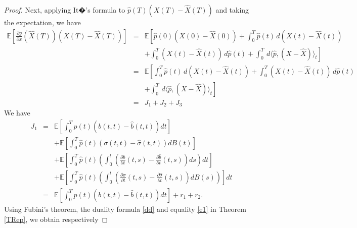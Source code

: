 \documentclass[12pt]{article}
\theoremstyle{remark}
\numberwithin{equation}{section}
\def\E{\mathbb E}
\def\E{\mathbb E}
\begin{document}
\begin{proof}
Next, applying It�'s formula to $\hat{p}(T)(X(T)-\hat{X}(T))$ and taking the expectation, we have
\begin{eqnarray}\label{Eq0005}
	\E\left[ \frac{\partial g}{\partial x}(\hat{X}(T))\left(X(T)-\hat{X}(T)\right)\right]  &=&\E\left[ \hat{p}(0)\left( X(0)-\hat{X}(0)\right)+\int_0^T \hat{p}(t)\,d\left( X(t)-\hat{X}(t)\right)\right.\nonumber \\
	&&\left. +\int_0^T\left( X(t)-\hat{X}(t)\right)\,d\hat{p}(t)
	+\int_0^T\,d\langle \hat{p},\left( X-\hat{X}\right)\rangle_t\right]\nonumber\\
&=&	\E\left[\int_0^T \hat{p}(t)\,d\left( X(t)-\hat{X}(t)\right)+\int_0^T\left( X(t)-\hat{X}(t)\right)\,d\hat{p}(t)\right.\nonumber\\
	&&\left.+\int_0^T\,d\langle \hat{p},\left( X-\hat{X}\right)\rangle_t\right]\nonumber\\
	&=&J_1+J_2+J_3
\end{eqnarray}
We have
\begin{eqnarray*}
	J_1&=&\E\left[\int_0^T\hat{p}(t)\left(b(t,t)-\hat{b}(t,t)\right)dt\right]\nonumber\\ 
	&&+\E\left[\int_0^T\hat{p}(t) \left(\sigma(t,t)-\hat{\sigma}(t,t)\right)dB(t)\right]\nonumber\\
	&&+\E\left[\int_0^T\hat{p}(t)\left( \int_0^t\left( \frac{\partial b}{\partial t }(t, s)-\frac{\partial \hat{b}}{\partial t }(t, s) \right) ds\right) dt\right]\nonumber\\
	&&+ \E\left[\int_0^T \hat{p}(t)\left(  \int_0^t\left(  \frac{\partial \sigma}{\partial t }(t, s)- \frac{\partial \hat{\sigma}}{\partial t }(t, s)\right) dB(s)\right) \right]dt\nonumber\\
	&=& \E\left[\int_0^T\hat{p}(t)\left(b(t,t)-\hat{b}(t,t)\right)dt\right]+r_1+r_2.	
\end{eqnarray*}
Using Fubini's theorem, the duality formula \eqref{dd} and equality \eqref{e1} in Theorem \ref{TRep}, we obtain respectively


\end{proof}
\end{document}
